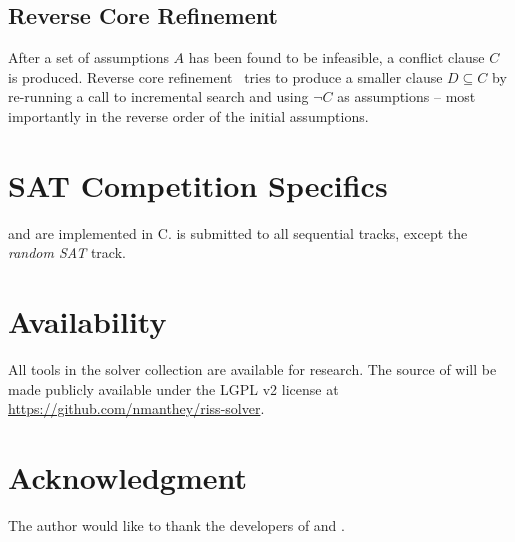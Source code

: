 \documentclass[conference]{IEEEtran}
\def\CC{{C\nolinebreak[4]\hspace{-.05em}\raisebox{.4ex}{\tiny\bf ++}}}
\begin{document}
\subsection{Reverse Core Refinement}

After a set of assumptions $A$ has been found to be infeasible, a conflict clause $C$ is produced.
Reverse core refinement~\cite{CoreRefinementManthey2015} tries to produce a smaller clause $D \subseteq C$ by re-running a call to incremental search and using $\neg C$ as assumptions -- most importantly in the reverse order of the initial assumptions.

\section{SAT Competition Specifics}

\riss and \coprocessor are implemented in \CC. 
\riss is submitted to all sequential tracks, except the \emph{random SAT} track.

\section{Availability}

All tools in the solver collection are available for research. 
The source of \riss will be made publicly available under the LGPL v2 license at \url{https://github.com/nmanthey/riss-solver}.

\section*{Acknowledgment}
The author would like to thank the developers of \glucose and \minisat. 



\end{document}
